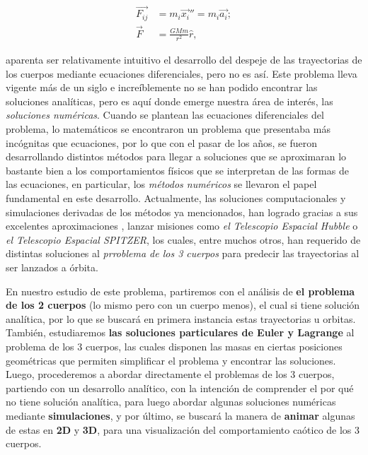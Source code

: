 \documentclass[proyecto.tex]{subfiles}
\begin{document}
\begin{align}
    \vec{F_{ij}} &= m_{i}\vec{x_{i}}'' = m_{i}\vec{a_i}; \label{eq:2leyN} \\
    \vec{F} &= \frac{GMm}{r^2}\hat{r},
\end{align}

\noindent aparenta ser relativamente intuitivo el desarrollo del despeje de las trayectorias de los cuerpos mediante ecuaciones diferenciales, pero no es así. Este problema lleva vigente más de un siglo e increíblemente no se han podido encontrar las soluciones analíticas, pero es aquí donde emerge nuestra área de interés, las \textit{soluciones numéricas}. Cuando se plantean las ecuaciones diferenciales del problema, lo matemáticos se encontraron un problema que presentaba más incógnitas que ecuaciones, por lo que con el pasar de los años, se fueron desarrollando distintos métodos para llegar a soluciones que se aproximaran lo bastante bien a los comportamientos físicos que se interpretan de las formas de las ecuaciones, en particular, los \textit{métodos numéricos} se llevaron el papel fundamental en este desarrollo. Actualmente, las soluciones computacionales y simulaciones derivadas de los métodos ya mencionados, han logrado gracias a sus excelentes aproximaciones , lanzar misiones como \textit{el Telescopio Espacial Hubble} o \textit{el Telescopio Espacial SPITZER}, los cuales, entre muchos otros, han requerido de distintas soluciones al \textit{prroblema de los 3 cuerpos} para predecir las trayectorias al ser lanzados a órbita.

\par En nuestro estudio de este problema, partiremos con el análisis de \textbf{el problema de los 2 cuerpos} (lo mismo pero con un cuerpo menos), el cual si tiene solución analítica, por lo que se buscará en primera instancia estas trayectorias u orbitas. También, estudiaremos \textbf{las soluciones particulares de Euler y Lagrange} al problema de los 3 cuerpos, las cuales disponen las masas en ciertas posiciones geométricas que permiten simplificar el problema y encontrar las soluciones. Luego, procederemos a abordar directamente el problemas de los 3 cuerpos, partiendo con un desarrollo analítico, con la intención de comprender el por qué no tiene solución analítica, para luego abordar algunas soluciones numéricas mediante \textbf{simulaciones}, y por último, se buscará la manera de \textbf{animar} algunas de estas en \textbf{2D} y \textbf{3D}, para una visualización del comportamiento caótico de los 3 cuerpos.
\end{document}
